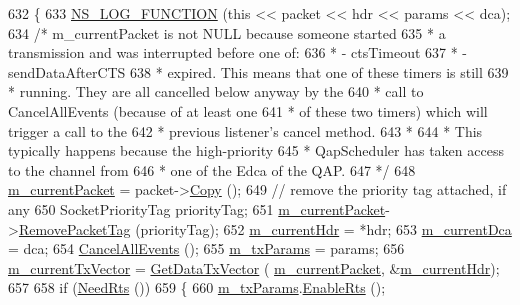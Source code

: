 \begin{DoxyCode}
632 \{
633   \hyperlink{log-macros-disabled_8h_a90b90d5bad1f39cb1b64923ea94c0761}{NS\_LOG\_FUNCTION} (\textcolor{keyword}{this} << packet << hdr << params << dca);
634   \textcolor{comment}{/* m\_currentPacket is not NULL because someone started}
635 \textcolor{comment}{   * a transmission and was interrupted before one of:}
636 \textcolor{comment}{   *   - ctsTimeout}
637 \textcolor{comment}{   *   - sendDataAfterCTS}
638 \textcolor{comment}{   * expired. This means that one of these timers is still}
639 \textcolor{comment}{   * running. They are all cancelled below anyway by the}
640 \textcolor{comment}{   * call to CancelAllEvents (because of at least one}
641 \textcolor{comment}{   * of these two timers) which will trigger a call to the}
642 \textcolor{comment}{   * previous listener's cancel method.}
643 \textcolor{comment}{   *}
644 \textcolor{comment}{   * This typically happens because the high-priority}
645 \textcolor{comment}{   * QapScheduler has taken access to the channel from}
646 \textcolor{comment}{   * one of the Edca of the QAP.}
647 \textcolor{comment}{   */}
648   \hyperlink{classns3_1_1MacLow_aa4f81bb523ceed1bbf5a84851b25e29c}{m\_currentPacket} = packet->\hyperlink{classns3_1_1Packet_a5d5c70802a5f77fc5f0001e0cfc1898b}{Copy} ();
649   \textcolor{comment}{// remove the priority tag attached, if any}
650   SocketPriorityTag priorityTag;
651   \hyperlink{classns3_1_1MacLow_aa4f81bb523ceed1bbf5a84851b25e29c}{m\_currentPacket}->\hyperlink{classns3_1_1Packet_a078fe922d976a417ab25ba2f3c2fd667}{RemovePacketTag} (priorityTag);
652   \hyperlink{classns3_1_1MacLow_aec9902bc8026338baf261d2de8fcd83b}{m\_currentHdr} = *hdr;
653   \hyperlink{classns3_1_1MacLow_a18945fbeea3c48c6bb8abd2d46429eeb}{m\_currentDca} = dca;
654   \hyperlink{classns3_1_1MacLow_afecf8a67fd2052dc23f94e77b9768d6b}{CancelAllEvents} ();
655   \hyperlink{classns3_1_1MacLow_a1c5ce6a0415d4a6d394bc9fc8f78327d}{m\_txParams} = params;
656   \hyperlink{classns3_1_1MacLow_af87bd81ded4d362f9f1dc89dbbee65a3}{m\_currentTxVector} = \hyperlink{classns3_1_1MacLow_a04bad04eade9ff1de0940b01c5bcf514}{GetDataTxVector} (
      \hyperlink{classns3_1_1MacLow_aa4f81bb523ceed1bbf5a84851b25e29c}{m\_currentPacket}, &\hyperlink{classns3_1_1MacLow_aec9902bc8026338baf261d2de8fcd83b}{m\_currentHdr});
657 
658   \textcolor{keywordflow}{if} (\hyperlink{classns3_1_1MacLow_abb03703a2f28b39d0cff52ce8488f7b3}{NeedRts} ())
659     \{
660       \hyperlink{classns3_1_1MacLow_a1c5ce6a0415d4a6d394bc9fc8f78327d}{m\_txParams}.\hyperlink{classns3_1_1MacLowTransmissionParameters_a119d03769cf51e528d03f686c6bd8ed5}{EnableRts} ();

\end{DoxyCode}
